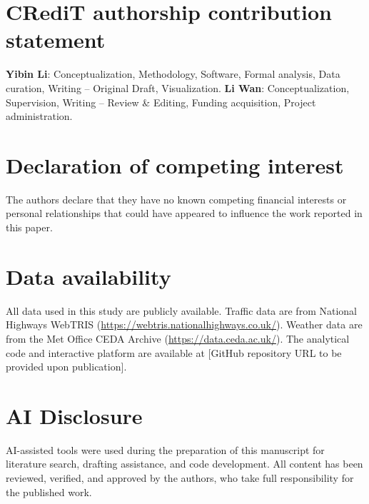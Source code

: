 \documentclass[review]{elsarticle}
\begin{document}
\section*{CRediT authorship contribution statement}

\textbf{Yibin Li}: Conceptualization, Methodology, Software, Formal analysis, Data curation, Writing -- Original Draft, Visualization. \textbf{Li Wan}: Conceptualization, Supervision, Writing -- Review \& Editing, Funding acquisition, Project administration.

\section*{Declaration of competing interest}

The authors declare that they have no known competing financial interests or personal relationships that could have appeared to influence the work reported in this paper.

\section*{Data availability}

All data used in this study are publicly available. Traffic data are from National Highways WebTRIS (\url{https://webtris.nationalhighways.co.uk/}). Weather data are from the Met Office CEDA Archive (\url{https://data.ceda.ac.uk/}). The analytical code and interactive platform are available at [GitHub repository URL to be provided upon publication].

\section*{AI Disclosure}

AI-assisted tools were used during the preparation of this manuscript for literature search, drafting assistance, and code development. All content has been reviewed, verified, and approved by the authors, who take full responsibility for the published work.




\end{document}
